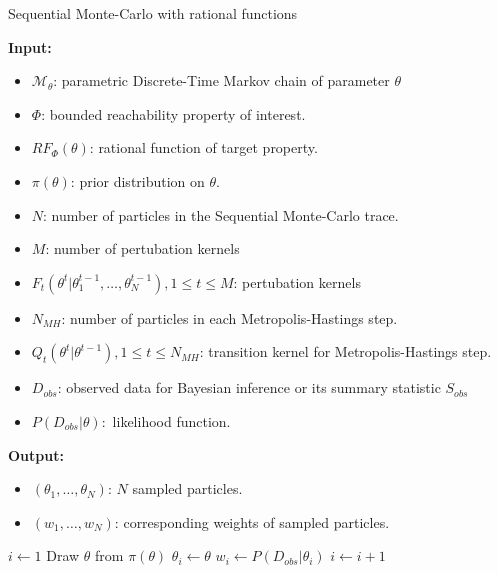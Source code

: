 \begin{algorithm}[H]
    \caption{Sequential Monte-Carlo with rational functions}
    \label{rf-smc-alg}
    \hspace*{\algorithmicindent} \textbf{Input:}
    \begin{itemize}
        \item $\mathcal{M}_\theta$: parametric Discrete-Time Markov chain of parameter $\theta$
        \item $\Phi$: bounded reachability property of interest.
        \item $RF_\Phi(\theta)$: rational function of target property.
        \item $\pi(\theta)$: prior distribution on $\theta$.
        \item $N$: number of particles in the Sequential Monte-Carlo trace.
        \item $M$: number of pertubation kernels
        \item $F_t(\theta^t | \theta^{t-1}_1,\ldots,\theta^{t-1}_N), 1\leq t \leq M$: pertubation kernels
        \item $N_{MH}$: number of particles in each Metropolis-Hastings step.
        \item $Q_t(\theta^t|\theta^{t-1}), 1 \leq t \leq N_{MH}$: transition kernel for Metropolis-Hastings step.
        \item $D_{obs}$: observed data for Bayesian inference or its summary statistic $S_{obs}$
        \item $P(D_{obs}|\theta):$ likelihood function.
    \end{itemize}
    \hspace*{\algorithmicindent} \textbf{Output:}
    \begin{itemize}
        \item $(\theta_1,\ldots,\theta_N)$: $N$ sampled particles.
        \item $(w_1,\ldots,w_N)$: corresponding weights of sampled particles.
    \end{itemize}
    \begin{algorithmic}[1]
        \State $i \leftarrow 1$
         
            \State Draw $\theta$ from $\pi(\theta)$
            \State $\theta_i \leftarrow \theta$
            \State $w_i \leftarrow P(D_{obs}|\theta_i)$
            \State $i \leftarrow i + 1$
        \EndWhile
\end{algorithmic}
\end{algorithm}

